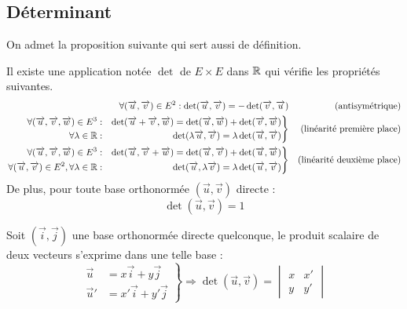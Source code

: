 \subsection{Déterminant}
On admet la proposition suivante qui sert aussi de définition.
\begin{prop}
Il existe une application notée $\det$ de $E\times E$ dans $\mathbb{R}$ qui vérifie les propriétés suivantes.
\begin{align*}
 \forall (\overrightarrow{u},\overrightarrow{v})\in E^2 : \det(\overrightarrow{u},\overrightarrow{v})=
-\det(\overrightarrow{v},\overrightarrow{u}) & &\text{(antisymétrique)}\\
\left. 
\begin{aligned}
 \forall (\overrightarrow{u},\overrightarrow{v},\overrightarrow{w})\in E^3 &:&
\det(\overrightarrow{u}+\overrightarrow{v},\overrightarrow{w})=\det(\overrightarrow{u},\overrightarrow{w})+\det(\overrightarrow{v},\overrightarrow{w})\\
\forall \lambda \in \mathbb{R} &:&  \det(\lambda\overrightarrow{u},\overrightarrow{v})=\lambda\det(\overrightarrow{u},\overrightarrow{v})
\end{aligned}
\right\rbrace  & & \text{(linéarité première place)} \\
\left. 
\begin{aligned}
 \forall (\overrightarrow{u},\overrightarrow{v},\overrightarrow{w})\in E^3 &:&
\det(\overrightarrow{u},\overrightarrow{v}+\overrightarrow{w})=\det(\overrightarrow{u},\overrightarrow{v})+\det(\overrightarrow{u},\overrightarrow{w})\\
\forall (\overrightarrow{u},\overrightarrow{v})\in E^2, \forall \lambda \in \mathbb{R} &:&  \det(\overrightarrow{u},\lambda\overrightarrow{v})=\lambda\det(\overrightarrow{u},\overrightarrow{v})
\end{aligned}
\right\rbrace  & & \text{(linéarité deuxième place)}
\end{align*}
De plus, pour toute base orthonormée $(\overrightarrow u, \overrightarrow v)$ directe :
\begin{displaymath}
 \det(\overrightarrow u, \overrightarrow v) = 1
\end{displaymath}
\end{prop}
\begin{prop}
 Soit $(\overrightarrow i, \overrightarrow j)$ une base orthonormée directe quelconque, le produit scalaire de deux vecteurs s'exprime dans une telle base :
\begin{displaymath}
 \left. 
\begin{aligned}
 \overrightarrow u &= x\overrightarrow i + y\overrightarrow j \\
 \overrightarrow u' &= x'\overrightarrow i + y'\overrightarrow j 
\end{aligned}
\right\rbrace \Rightarrow
\det(\overrightarrow u , \overrightarrow v) = 
\begin{vmatrix}
 x & x' \\
 y & y'
\end{vmatrix}
\end{displaymath}
\end{prop}
